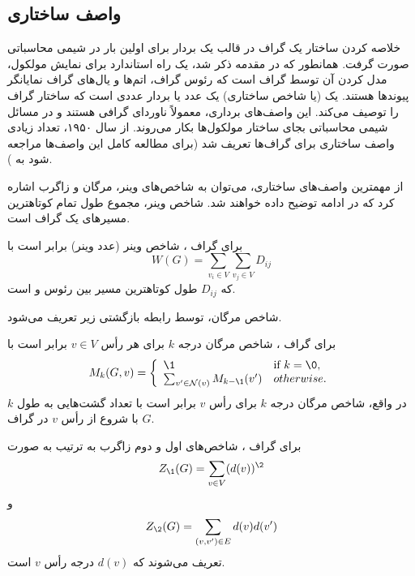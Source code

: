 \subsection{واصف ساختاری}
خلاصه کردن ساختار یک گراف در قالب یک بردار برای اولین بار در شیمی محاسباتی صورت گرفت‌. همانطور که در مقدمه ذکر شد، یک راه استاندارد برای نمایش مولکول، مدل کردن آن توسط گراف است که رئوس گراف، اتم‌ها و یال‌های گراف نمایانگر پیوندها هستند. یک (یا شاخص ساختاری) یک عدد یا بردار عددی است که ساختار گراف را توصیف می‌کند. این واصف‌های برداری، معمولاً  ناوردای گرافی هستند و در مسائل شیمی محاسباتی بجای ساختار مولکول‌ها بکار می‌روند.  از سال ۱۹۵۰، تعداد زیادی واصف ساختاری برای گراف‌ها تعریف شد (برای مطالعه کامل این واصف‌ها مراجعه شود به ).

از مهمترین واصف‌های ساختاری، می‌توان به شاخص‌های وینر، مرگان و زاگرب اشاره کرد که در ادامه توضیح داده خواهند شد. شاخص وینر، مجموع طول تمام کوتاهترین مسیرهای یک گراف است.

\begin{definition}
برای گراف ، شاخص وینر (عدد وینر) برابر است با
\begin{equation*}
W(G) = \sum_{v_i\in V}\sum_{v_j\in V} D_{ij}
\end{equation*}
که $D_{ij}$ طول کوتاهترین مسیر بین رئوس \Vi و \Vj است.
\end{definition}

شاخص مرگان، توسط رابطه بازگشتی زیر تعریف می‌شود.
\begin{definition}
برای گراف ، شاخص مرگان درجه $k$ برای هر رأس $v \in V$ برابر است با
\begin{equation*}
M_k(G,v) = 
\left\{
	\begin{array}{ll}
		\1  & \mbox{if } k = \0, \\
		{\sum_{v^\prime\in \mN(v)}M_{k-\1}(v^\prime)} & otherwise.
	\end{array}
\right.
\end{equation*}
در واقع، شاخص مرگان درجه $k$ برای رأس $v$ برابر است با تعداد گشت‌هایی به طول $k$ با شروع از رأس $v$ در گراف $G$.
\end{definition}

\begin{definition}
برای گراف ، شاخص‌های اول و دوم زاگرب به ترتیب به صورت
\begin{equation*}
Z_\1(G) = \sum_{v\in V}(d(v))^\2
\end{equation*}
و
\begin{equation*}
Z_\2(G) = \sum_{(v,v^\prime)\in E}d(v)d(v^\prime)
\end{equation*}
تعریف می‌شوند که $d(v)$ درجه رأس $v$ است.
\end{definition}

